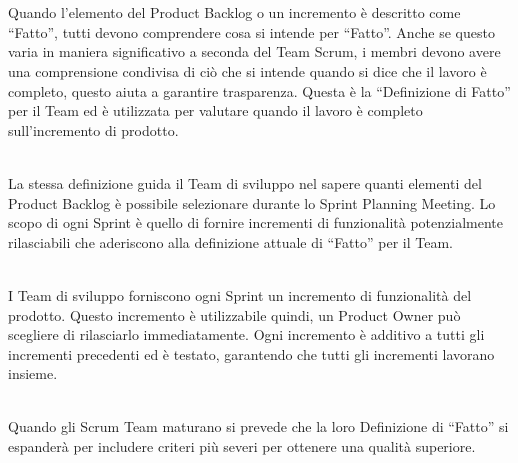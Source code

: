 
\section*{\color{Blue}{Definizione di ``Fatto''}}%
\label{sec:definition_of_done}

Quando l'elemento del Product Backlog o un incremento \`e descritto come ``Fatto'', tutti devono comprendere cosa si intende per 
``Fatto''.  Anche se questo varia in maniera significativo a seconda del Team Scrum, i membri devono avere una comprensione 
condivisa di ci\`o che si intende quando si dice che il lavoro \`e completo, questo aiuta a garantire trasparenza. Questa \`e la 
``Definizione di Fatto'' per il Team ed \`e utilizzata per valutare quando il lavoro \`e completo sull'incremento di prodotto. \newline

\\La stessa definizione guida il Team di sviluppo nel sapere quanti elementi del Product Backlog \`e possibile selezionare 
durante lo Sprint Planning Meeting. Lo scopo di ogni Sprint \`e quello di fornire incrementi di funzionalit\`a potenzialmente 
rilasciabili che aderiscono alla definizione attuale di ``Fatto'' per il Team. \newline

\\I Team di sviluppo forniscono ogni Sprint un incremento di funzionalit\`a del prodotto. Questo incremento \`e utilizzabile  
quindi, un Product Owner pu\`o scegliere di rilasciarlo immediatamente. Ogni incremento \`e additivo a tutti gli incrementi 
precedenti ed \`e testato, garantendo che tutti gli incrementi lavorano insieme. \newline

\\Quando gli Scrum Team maturano si prevede che la loro Definizione di ``Fatto'' si espander\`a per includere criteri pi\`u 
severi per ottenere una qualit\`a superiore.

